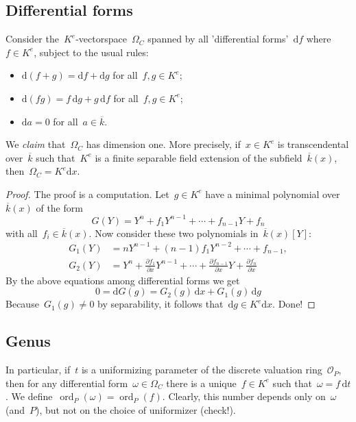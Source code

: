 \subsection{Differential forms}
Consider the~$K^e$-vectorspace~$\Omega_C$ spanned by all 'differential forms'~$\mathrm{d}f$ where~$f \in K^e$, subject to the usual rules:
\begin{itemize}
  \item $\mathrm{d}(f+g)=\mathrm{d}f+\mathrm{d}g$ for all~$f,g \in K^e$;
  \item $\mathrm{d}(fg) = f\,\mathrm{d}g + g\,\mathrm{d}f$ for all~$f,g \in K^e$;
  \item $\mathrm{d}a = 0$ for all~$a \in \overline{k}$.
\end{itemize}

We \emph{claim} that~$\Omega_C$ has dimension one. More precisely, if~$x \in K^e$ is transcendental over~$\overline{k}$ such that~$K^e$ is a finite separable field extension of the subfield~$\overline{k}(x)$, then~$\Omega_C = K^e \mathrm{d}x$.

\begin{proof}
  The proof is a computation. Let~$g \in K^e$ have a minimal polynomial over~$\overline{k}(x)$ of the form
  \begin{equation}
    G(Y) = Y^n + f_1 Y^{n-1} + \cdots + f_{n-1} Y + f_n
  \end{equation}
  with all~$f_i \in \overline{k}(x)$. Now consider these two polynomials in~$\overline{k}(x)[Y]$: 
  \begin{equation}
    \begin{aligned}
      G_1(Y) &= n Y^{n-1} + (n-1) f_1 Y^{n-2} + \cdots + f_{n-1},\\
      G_2(Y) &= Y^n + \frac{\partial f_{1}}{\partial x} Y^{n-1} + \cdots + \frac{\partial f_{n-1}}{\partial x} Y + \frac{\partial f_n}{\partial x}
    \end{aligned}
  \end{equation}
  By the above equations among differential forms we get
  \begin{equation}
    0 = \mathrm{d} G(g) = G_2(g)\,\mathrm{d}x + G_1(g)\, \mathrm{d}g
  \end{equation}
  Because~$G_1(g) \not= 0$ by separability, it follows that~$\mathrm{d}g \in K^e \mathrm{d}x$. Done!
\end{proof}


\subsection{Genus}
In particular, if~$t$ is a uniformizing parameter of the discrete valuation ring~$\mathcal{O}_P$, then for any differential form~$\omega \in \Omega_C$ there is a unique~$f \in K^e$ such that~$\omega = f\,\mathrm{d}t$. We define~$\operatorname{ord}_P(\omega) =\operatorname{ord}_P(f)$. Clearly, this number depends only on~$\omega$ (and~$P$), but not on the choice of uniformizer (check!).

